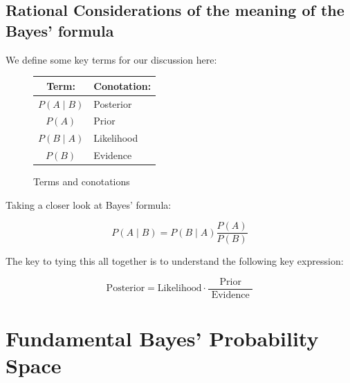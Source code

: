 \documentclass[
  12 pt,
  a4paper,
]{book}
\numberwithin{equation}{section}
\theoremstyle{plain}      %
\theoremstyle{definition} %
\theoremstyle{remark}     %
\theoremstyle{note}         %
\begin{document}
\hypertarget{rational-considerations-of-the-meaning-of-the-bayes-formula}{%
\subsection{Rational Considerations of the meaning of the Bayes'
formula}\label{rational-considerations-of-the-meaning-of-the-bayes-formula}}

We define some key terms for our discussion here:

\begin{figure}[htbp]
\centering
\begin{tabular}{cl} 
Term: & Conotation: \\
\hline
$P(A\! \mid \! B)$ & Posterior \\
$P(A)$ & Prior \\
$P(B\! \mid \!A)$ & Likelihood \\
$P(B)$ & Evidence
\end{tabular}
\caption{Terms and conotations}
\label{fig:conotations}
\end{figure}

Taking a closer look at Bayes' formula:

\[
P(A\! \mid\! B)=P(B\! \mid\! A) \frac{P(A)}{P(B)}
\]

The key to tying this all together is to understand the following key
expression:

\[
\text {Posterior} = \text {Likelihood} \cdot \frac{\text { Prior }}{\text { Evidence }}
\]

\begin{figure}[htbp]
\centering
{}
\label{fig:B_to_A}
\end{figure}

\newpage

\hypertarget{fundamental-bayes-probability-space}{%
\section{Fundamental Bayes' Probability
Space}\label{fundamental-bayes-probability-space}}
\end{document}
